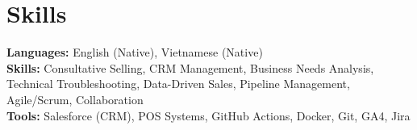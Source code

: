 \documentclass[11pt]{article}
\begin{document}
\vspace{-18.5pt}

\section*{Skills}
\textbf{Languages:} English (Native), Vietnamese (Native)\\
\textbf{Skills:} Consultative Selling, CRM Management, Business Needs Analysis, Technical Troubleshooting, Data-Driven Sales, Pipeline Management, Agile/Scrum, Collaboration\\
\textbf{Tools:} Salesforce (CRM), POS Systems, GitHub Actions, Docker, Git, GA4, Jira

\vspace{-6.5pt}
\end{document}
